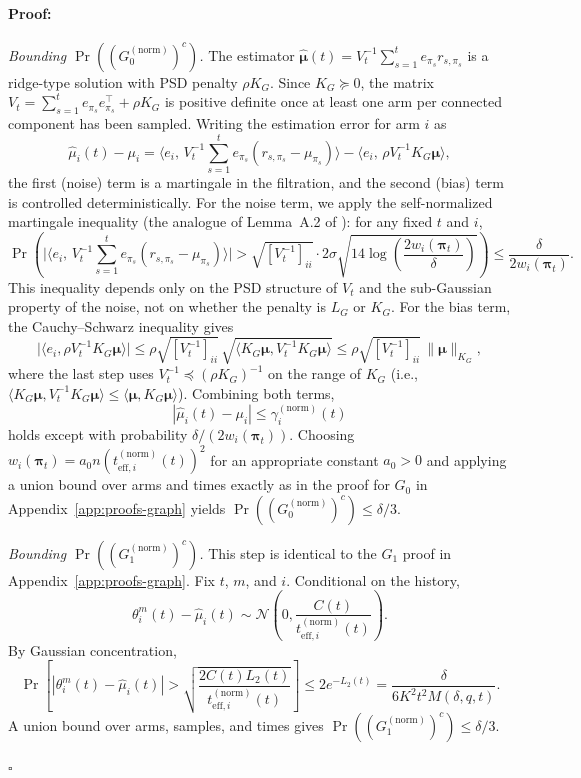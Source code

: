 \documentclass{article}
\newenvironment{proof}{\paragraph{Proof:}}{\hfill$\square$}
\begin{document}
\begin{proof}

\emph{Bounding $\Pr((G_0^{(\mathrm{norm})})^c)$.}
The estimator $\widehat{\bm\mu}(t)=V_t^{-1}\sum_{s=1}^t e_{\pi_s}r_{s,\pi_s}$ is a ridge-type solution with PSD penalty $\rho K_G$. Since $K_G\succeq 0$, the matrix $V_t=\sum_{s=1}^t e_{\pi_s}e_{\pi_s}^\top +\rho K_G$ is positive definite once at least one arm per connected component has been sampled. Writing the estimation error for arm $i$ as
\[
\widehat\mu_i(t)-\mu_i
= \bigl\langle e_i,\,V_t^{-1}\sum_{s=1}^t e_{\pi_s}(r_{s,\pi_s}-\mu_{\pi_s})\bigr\rangle
-\bigl\langle e_i,\,\rho V_t^{-1}K_G\bm\mu\bigr\rangle,
\]
the first (noise) term is a martingale in the filtration, and the second (bias) term is controlled deterministically. For the noise term, we apply the self-normalized martingale inequality (the analogue of Lemma~A.2 of \citealt{thaker2022maximizing}): for any fixed $t$ and $i$,
\[
\Pr\!\left(
\bigl|\bigl\langle e_i,\,V_t^{-1}\sum_{s=1}^t e_{\pi_s}(r_{s,\pi_s}-\mu_{\pi_s})\bigr\rangle\bigr|
>
\sqrt{[V_t^{-1}]_{ii}}\cdot 2\sigma\sqrt{14\log\!\left(\frac{2w_i(\boldsymbol\pi_t)}{\delta}\right)}
\right)
\le \frac{\delta}{2w_i(\boldsymbol\pi_t)}.
\]
This inequality depends only on the PSD structure of $V_t$ and the sub-Gaussian property of the noise, not on whether the penalty is $L_G$ or $K_G$. For the bias term, the Cauchy--Schwarz inequality gives
\[
\bigl|\langle e_i,\rho V_t^{-1}K_G\bm\mu\rangle\bigr|
\le
\rho\sqrt{[V_t^{-1}]_{ii}}\,\sqrt{\langle K_G\bm\mu,V_t^{-1}K_G\bm\mu\rangle}
\le
\rho\sqrt{[V_t^{-1}]_{ii}}\,\|\bm\mu\|_{K_G},
\]
where the last step uses $V_t^{-1}\preceq (\rho K_G)^{-1}$ on the range of $K_G$ (i.e., $\langle K_G\bm\mu,V_t^{-1}K_G\bm\mu\rangle\le \langle\bm\mu,K_G\bm\mu\rangle$). Combining both terms,
\[
|\widehat\mu_i(t)-\mu_i|
\le \gamma_i^{(\mathrm{norm})}(t)
\]
holds except with probability $\delta/(2w_i(\boldsymbol\pi_t))$. Choosing $w_i(\boldsymbol\pi_t)=a_0 n (t_{\mathrm{eff},i}^{(\mathrm{norm})}(t))^2$ for an appropriate constant $a_0>0$ and applying a union bound over arms and times exactly as in the proof for $G_0$ in Appendix~\ref{app:proofs-graph} yields $\Pr((G_0^{(\mathrm{norm})})^c)\le\delta/3$.

\emph{Bounding $\Pr((G_1^{(\mathrm{norm})})^c)$.}
This step is identical to the $G_1$ proof in Appendix~\ref{app:proofs-graph}. Fix $t$, $m$, and $i$. Conditional on the history,
\[
\theta_i^m(t)-\widehat\mu_i(t)
\sim
\mathcal N\!\left(0,\frac{C(t)}{t_{\mathrm{eff},i}^{(\mathrm{norm})}(t)}\right).
\]
By Gaussian concentration,
\[
\Pr\!\left[
|\theta_i^m(t)-\widehat\mu_i(t)|>
\sqrt{\frac{2C(t)L_2(t)}{t_{\mathrm{eff},i}^{(\mathrm{norm})}(t)}}
\right]
\le 2e^{-L_2(t)}
= \frac{\delta}{6K^2t^2M(\delta,q,t)}.
\]
A union bound over arms, samples, and times gives $\Pr((G_1^{(\mathrm{norm})})^c)\le\delta/3$.


\end{proof}
\end{document}
